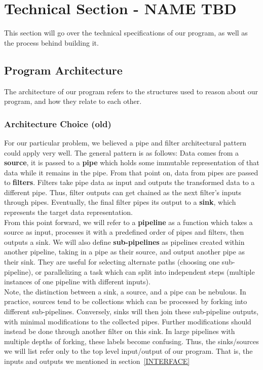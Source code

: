 \documentclass[11pt]{article}
\begin{document}
    \section{Technical Section - NAME TBD}
    This section will go over the technical specifications of our program, as well as the process behind building it.
    \subsection{Program Architecture}
    The architecture of our program refers to the structures used to reason about our program, and how they relate to each other.

    \subsubsection{Architecture Choice (old)}
    For our particular problem, we believed a pipe and filter architectural pattern could apply very well.
    The general pattern is as follows: Data comes from a \textbf{source},
    it is passed to a \textbf{pipe} which holds some immutable representation of that data while it remains in the pipe.
    From that point on, data from pipes are passed to \textbf{filters}.
    Filters take pipe data as input and outputs the transformed data to a different pipe.
    Thus, filter outputs can get chained as the next filter's inputs through pipes.
    Eventually, the final filter pipes its output to a \textbf{sink}, which represents the target data representation.\\

    From this point forward, we will refer to a \textbf{pipeline} as a function which takes a source as input,
    processes it with a predefined order of pipes and filters, then outputs a sink.
    We will also define \textbf{sub-pipelines} as pipelines created within another pipeline,
    taking in a pipe as their source, and output another pipe as their sink.
    They are useful for selecting alternate paths (choosing one sub-pipeline),
    or parallelizing a task which can split into independent steps (multiple instances of one pipeline with different inputs).\\


    Note, the distinction between a sink, a source, and a pipe can be nebulous.
    In practice, sources tend to be collections which can be processed by forking into different sub-pipelines.
    Conversely, sinks will then join these sub-pipeline outputs, with minimal modifications to the collected pipes.
    Further modifications should instead be done through another filter on this sink.
    In large pipelines with multiple depths of forking, these labels become confusing.
    Thus, the sinks/sources we will list refer only to the top level input/output of our program.
    That is, the inputs and outputs we mentioned in section~\ref{INTERFACE}\\
\end{document}
